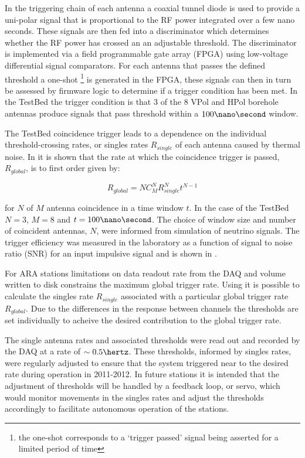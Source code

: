 In the triggering chain of each antenna a coaxial tunnel diode is used to provide a uni-polar signal that is proportional to the RF power integrated over a few nano seconds. These signals are then fed into a discriminator which determines whether the RF power has crossed an an adjustable threshold. The discriminator is implemented via a field programmable gate array (FPGA) using low-voltage differential signal comparators. For each antenna that passes the defined threshold a one-shot \footnote{the one-shot corresponds to a `trigger passed' signal being asserted for a limited period of time} is generated in the FPGA, these signals can then in turn be assessed by firmware logic to determine if a trigger condition has been met. In the TestBed the trigger condition is that 3 of the 8 VPol and HPol borehole antennas produce signals that pass threshold within a $100 \nano\second$ window. 

The TestBed coincidence trigger leads to a dependence on the individual threshold-crossing rates, or singles rates $R_{single}$ of each antenna caused by thermal noise. In  it is shown that the rate at which the coincidence trigger is passed, $R_{global}$, is to first order given by:

\begin{equation}
  R_{global} = N C^{N}_{M}R_{single}^{N}t^{N-1}
  \label{eq:ara-detector:TestBed:Trigger-Rate}
\end{equation}

\noindent for $N$ of $M$ antenna coincidence in a time window $t$. In the case of the TestBed $N=3$, $M=8$ and $t=100\nano\second$. The choice of window size and number of coincident antennas, $N$, were informed from simulation of neutrino signals. The trigger efficiency was measured in the laboratory as a function of signal to noise ratio (SNR) for an input impulsive signal and is shown in .

For ARA stations limitations on data readout rate from the DAQ and volume written to disk constrains the maximum global trigger rate. Using  it is possible to calculate the singles rate $R_{single}$ associated with a particular global trigger rate $R_{global}$. Due to the differences in the response between channels the thresholds are set individually to acheive the desired contribution to the global trigger rate.

The single antenna rates and associated thresholds were read out and recorded by the DAQ at a rate of $\sim 0.5 \hertz$. These thresholds, informed by singles rates, were regularly adjusted to ensure that the system triggered near to the desired rate during operation in 2011-2012. In future stations it is intended that the adjustment of thresholds will be handled by a feedback loop, or servo, which would monitor movements in the singles rates and adjust the thresholds accordingly to facilitate autonomous operation of the stations.

